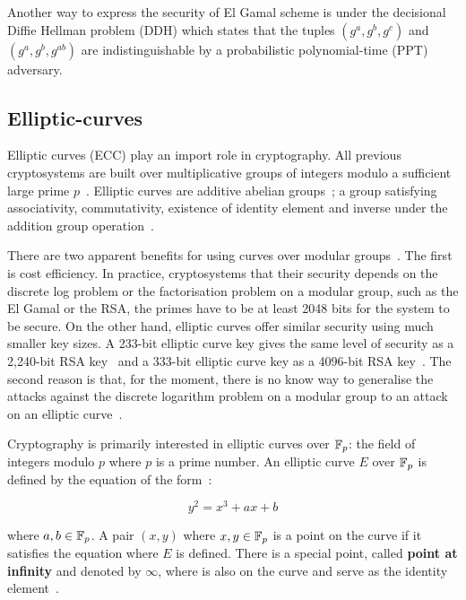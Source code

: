 Another way to express the security of El Gamal scheme is under the decisional Diffie Hellman problem (DDH) which states that the tuples $(g^a, g^b, g^c)$ and $(g^a, g^b, g^{ab})$ are indistinguishable by a probabilistic polynomial-time (PPT) adversary.

\subsection{Elliptic-curves}
\label{preliminaries:pub:el_curves}

Elliptic curves (ECC) play an import role in cryptography. All previous cryptosystems are built over multiplicative groups of integers modulo a sufficient large prime $p$~\cite{kiagias:crypto, boneh_crypto}. Elliptic curves are additive abelian groups~\cite{kiagias:crypto}; a group satisfying associativity, commutativity, existence of identity element and inverse under the addition group operation~\cite{elliptic_curves_2}.

There are two apparent benefits for using curves over modular groups~\cite{kiagias:crypto}. The first is cost efficiency. In practice, cryptosystems that their security depends on the discrete log problem or the factorisation problem on a modular group, such as the El Gamal or the RSA, the primes have to be at least 2048 bits for the system to be secure. On the other hand, elliptic curves offer similar security using much smaller key sizes. A 233-bit elliptic curve key gives the same level of security as a 2,240-bit RSA key~\cite{ecc_rsa_bits, ecc_rsa_bits_1} and a 333-bit elliptic curve key as a 4096-bit RSA key~\cite{blake1999elliptic}. The second reason is that, for the moment, there is no know way to generalise the attacks against the discrete logarithm problem on a modular group to an attack on an elliptic curve~\cite{kiagias:crypto}.

Cryptography is primarily interested in elliptic curves over $\mathbb{F}_p$: the field of integers modulo $p$ where $p$ is a prime number. An elliptic curve $E$ over $\mathbb{F}_p$ is defined by the equation of the form~\cite{elliptic_curves, elliptic_curves_2}:

\begin{equation*}
  y^2 = x^3 + ax + b
\end{equation*}

where $a, b \in \mathbb{F}_p$. A pair $(x, y)$ where $x, y \in \mathbb{F}_p$ is a point on the curve if it satisfies the equation where $E$ is defined. There is a special point, called \textbf{point at infinity} and denoted by $\infty$, where is also on the curve and serve as the identity element~\cite{elliptic_curves_2}.


